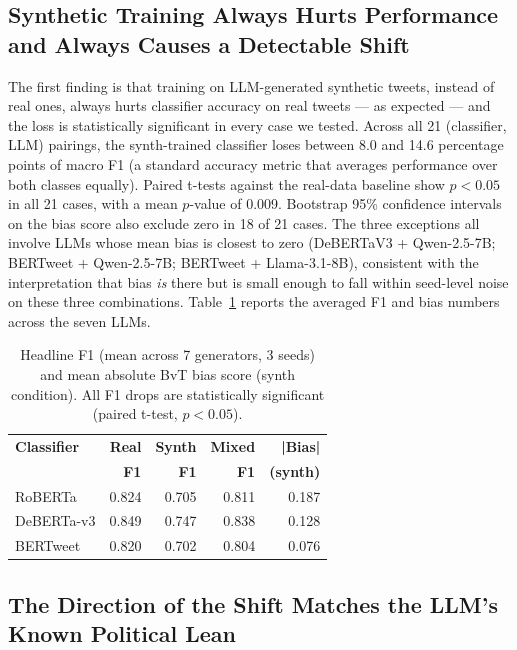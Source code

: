 \documentclass[11pt]{article}
\begin{document}
\subsection{Synthetic Training Always Hurts Performance and Always Causes a Detectable Shift}

The first finding is that training on LLM-generated synthetic tweets, instead of real ones, always hurts classifier accuracy on real tweets --- as expected --- and the loss is statistically significant in every case we tested. Across all 21 (classifier, LLM) pairings, the synth-trained classifier loses between 8.0 and 14.6 percentage points of macro F1 (a standard accuracy metric that averages performance over both classes equally). Paired t-tests against the real-data baseline show $p < 0.05$ in all 21 cases, with a mean $p$-value of 0.009. Bootstrap 95\% confidence intervals on the bias score also exclude zero in 18 of 21 cases. The three exceptions all involve LLMs whose mean bias is closest to zero (DeBERTaV3 + Qwen-2.5-7B; BERTweet + Qwen-2.5-7B; BERTweet + Llama-3.1-8B), consistent with the interpretation that bias \emph{is} there but is small enough to fall within seed-level noise on these three combinations. Table~\ref{tab:headline} reports the averaged F1 and bias numbers across the seven LLMs.

\begin{table}[t]
\centering
\small
\begin{tabular}{lrrrr}
\toprule
\textbf{Classifier} & \textbf{Real} & \textbf{Synth} & \textbf{Mixed} & \textbf{|Bias|} \\
                    & \textbf{F1}   & \textbf{F1}    & \textbf{F1}    & \textbf{(synth)} \\
\midrule
RoBERTa     & 0.824 & 0.705 & 0.811 & 0.187 \\
DeBERTa-v3  & 0.849 & 0.747 & 0.838 & 0.128 \\
BERTweet    & 0.820 & 0.702 & 0.804 & 0.076 \\
\bottomrule
\end{tabular}
\caption{Headline F1 (mean across 7 generators, 3 seeds) and mean absolute BvT bias score (synth condition). All F1 drops are statistically significant (paired t-test, $p < 0.05$).}
\label{tab:headline}
\end{table}

\subsection{The Direction of the Shift Matches the LLM's Known Political Lean}
\end{document}
